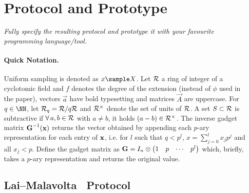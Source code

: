 
\section{Protocol and Prototype}\label{sec:prototype}

\begin{center}
\itshape
	Fully specify the resulting protocol and prototype it with your favourite programming language/tool.
\end{center}

\paragraph{Quick Notation.}
Uniform sampling is denoted as $x \sample X$.
Let $\Rring$ a ring of integer of a cyclotomic field and $f$ denotes the degree of the extension
(instead of $\phi$ used in the paper), vectors $\vec{a}$ have bold typesetting
and matrices $\vec{A}$ are uppercase.
For $\qprime \in \NN$, let $\Rring[\qprime] = \Rring/q\Rring$ and $\Rring^\times$ denote the
set of units of $\Rring$.
A set $S \subset \Rring$ is subtractive if $\forall\,{a,b \in \Rring}$ with $a \neq b$, it holds
$(a-b) \in \Rring^{\times}$.
The inverse gadget matrix $\vGi(\vx)$ returns the vector obtained by appending each $p$-ary representation
for each entry of $\vx$, i.e. for $l$ such that $q < p^l$, $x = \sum_{j=0}^{l} x_{j} p^j$ and all
$x_j < p$.
Define the gadget matrix as $\vG = I_{n} \otimes \begin{pmatrix} 1 & p & \cdots & p^l\end{pmatrix}$
which, briefly, takes a $p$-ary representation and returns the original value.

\vspace{2mm}



\subsection{Lai--Malavolta \PoSW\ Protocol}

